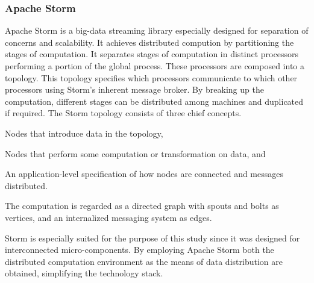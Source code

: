 \subsubsection*{Apache Storm}
Apache Storm is a big-data streaming library especially designed for separation of concerns and scalability. It achieves distributed compution by partitioning the stages of computation. It separates stages of computation in distinct processors performing a portion of the global process. These processors are composed into a topology. This topology specifies which processors communicate to which other processors using Storm's inherent message broker. By breaking up the computation, different stages can be distributed among machines and duplicated if required. The Storm topology consists of three chief concepts.
\begin{description}[style=nextline]
\nospace
\item[Spouts] Nodes that introduce data in the topology,
\item[Bolts] Nodes that perform some computation or transformation on data, and
\item[Topology] An application-level specification of how nodes are connected and messages distributed.
\end{description}
The computation is regarded as a directed graph with spouts and bolts as vertices, and an internalized messaging system as edges.


Storm is especially suited for the purpose of this study since it was designed for interconnected micro-components. By employing Apache Storm both the distributed computation environment as the means of data distribution are obtained, simplifying the technology stack.

